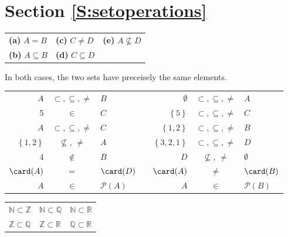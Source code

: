 \section*{Section \ref{S:setoperations}}
\renewcommand{\labelenumi}{(\textbf{\alph{enumi}})}

\begin{list}{\bf{\ref{exer:sec41-1}.}}
\item \begin{tabular}[t]{p{1.2in} p{1.2in} p{1.2in}}
\textbf{(a)} $A = B$  &  \textbf{(c)} $C \ne D$  &  \textbf{(e)} $A \not \subseteq D$ \\
\textbf{(b)} $A \subseteq B$  &  \textbf{(d)} $C \subseteq D$ &  \\
\end{tabular}
\end{list}


\begin{list}{\bf{\ref{exer41-equalsets}.}}
\item In both cases, the two sets have preceisely the same elements.
\end{list}


\begin{list}{\bf{\ref{exer:sec41-3}.}}
\item \begin{tabular}[t]{r c l c r c l }
$A$ & $\subset, \subseteq , \ne$ & $B$ &  &  $\emptyset$ & $\subset , \subseteq , \ne$ & $A$  \\
5   & $\in$ & $C$ & & $\left\{ 5 \right\}$ & $\subset , \subseteq , \ne$ & $C$ \\
$A$ & $\subset, \subseteq , \ne$ & $C$ &  &  $\left\{ 1,2 \right\}$ & $\subset, \subseteq , \ne$ & $B$ \\
$\left\{ 1,2 \right\}$ & $\not\subseteq$, $\ne$ & $A$ &  &  $\left\{ 3,2,1 \right\}$ & $\subset, \subseteq , \ne$ & $D$ \\
4  &  $\notin$ &  $B$ &  &  $D$ &  $\not\subseteq$, $\ne$ &  $\emptyset$ \\
$\card(A)$ &  $=$ & $\card(D)$ & & $\card(A)$ & $\ne$ & $\card(B)$ \\
$A$ & $\in$ &  $\mathcal{P} \left( A \right)$ & & $A$ & $\in$ &  $\mathcal{P} \left( B \right)$ \\
\end{tabular}
\end{list}



\begin{list}{\bf{\ref{exer:sec51-numbers}.}}
\item \begin{tabular}[t]{l l l}
$\mathbb{N} \subset \mathbb{Z}$  &  $\mathbb{N} \subset \mathbb{Q}$ & 
$\mathbb{N} \subset \mathbb{R}$   \\
$\mathbb{Z} \subset \mathbb{Q}$  &  $\mathbb{Z} \subset \mathbb{R}$   & $\mathbb{Q} \subset \mathbb{R}$ \\
\end{tabular}
\end{list}


